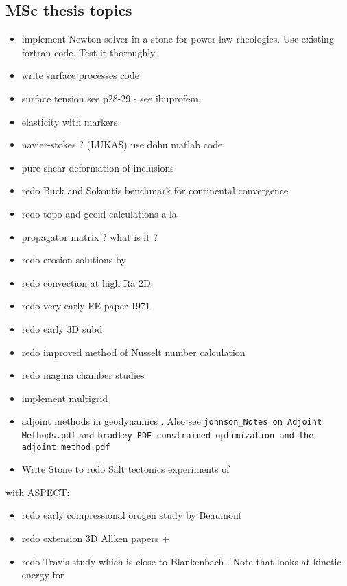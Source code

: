 \subsection{MSc thesis topics}
\begin{itemize} 
\item implement Newton solver in a stone for power-law rheologies. Use existing fortran code. Test it thoroughly.
\item write surface processes code
\item surface tension see \cite{reddybook2}p28-29 - see ibuprofem, \cite{dett04} 
\item elasticity with markers
\item navier-stokes ? (LUKAS) use dohu matlab code
\item pure shear deformation of inclusions \cite{trla00}
\item redo Buck and Sokoutis benchmark for continental convergence \cite{buso94}
\item redo topo and geoid calculations a la \cite{king09}
\item propagator matrix ? what is it ? \cite{ribe18} 
\Literature \cite{haoc78,haoc81,riha84,zhon96,como97,mohc98,zhzu00,lezh08,leha08,mofm07,mibb09,fope91,lizh13,bugo94} 
\item redo erosion solutions by \cite{cull60} 
\item redo convection at high Ra 2D \cite{scan85}
\item redo very early FE paper 1971 \cite{stbe71}
\item redo early 3D subd \cite{zhgu96}
\item redo improved method of Nusselt number calculation \cite{hohr87}
\item redo magma chamber studies \cite{cuwi14,gehn18}
\item implement multigrid
\item adjoint methods in geodynamics \cite{bugs09,ghbu16,hobo14,isks07,ligs17,wahg15,wama09,wosp14}.
Also see {\tt johnson\_Notes on Adjoint Methods.pdf} and {\tt bradley-PDE-constrained optimization and the adjoint method.pdf} 
\item Write Stone to redo Salt tectonics experiments of \cite{dacl94}
\end{itemize}

with ASPECT:

\begin{itemize}
\item redo early compressional orogen study by Beaumont \cite{bequ94}
\item redo extension 3D Allken papers + \cite{poay84,katl95} 
\item redo Travis study \cite{trab90} which is close to Blankenbach \cite{blbc89}. Note that \cite{maie12} looks at kinetic energy for \cite{trab90} 
\end{itemize}


